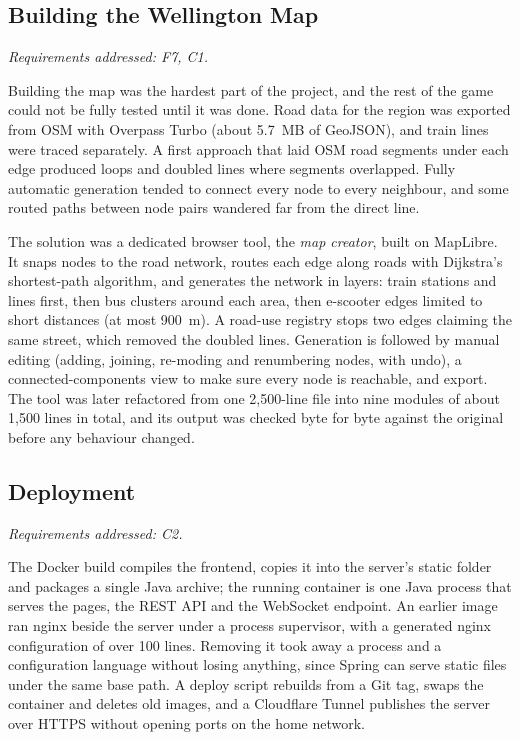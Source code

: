 \documentclass[lettersize,journal]{IEEEtran}
\newcommand{\reqs}[1]{\noindent\textit{Requirements addressed: #1.}\par\smallskip}
\begin{document}
\subsection{Building the Wellington Map}\label{sec:mapbuild}
\reqs{F7, C1}
Building the map was the hardest part of the project, and the rest of the game could not be fully tested until it was done. Road data for the region was exported from OSM with Overpass Turbo (about 5.7~MB of GeoJSON), and train lines were traced separately. A first approach that laid OSM road segments under each edge produced loops and doubled lines where segments overlapped. Fully automatic generation tended to connect every node to every neighbour, and some routed paths between node pairs wandered far from the direct line.

The solution was a dedicated browser tool, the \emph{map creator}, built on MapLibre. It snaps nodes to the road network, routes each edge along roads with Dijkstra's shortest-path algorithm, and generates the network in layers: train stations and lines first, then bus clusters around each area, then e-scooter edges limited to short distances (at most 900~m). A road-use registry stops two edges claiming the same street, which removed the doubled lines. Generation is followed by manual editing (adding, joining, re-moding and renumbering nodes, with undo), a connected-components view to make sure every node is reachable, and export. The tool was later refactored from one 2,500-line file into nine modules of about 1,500 lines in total, and its output was checked byte for byte against the original before any behaviour changed.

\subsection{Deployment}\label{sec:deploy}
\reqs{C2}
The Docker build compiles the frontend, copies it into the server's static folder and packages a single Java archive; the running container is one Java process that serves the pages, the REST API and the WebSocket endpoint. An earlier image ran nginx beside the server under a process supervisor, with a generated nginx configuration of over 100 lines. Removing it took away a process and a configuration language without losing anything, since Spring can serve static files under the same base path. A deploy script rebuilds from a Git tag, swaps the container and deletes old images, and a Cloudflare Tunnel publishes the server over HTTPS without opening ports on the home network.
\end{document}

